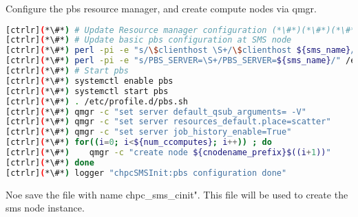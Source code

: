 
	Configure the pbs resource manager, and create compute nodes via qmgr.



\begin{lstlisting}[language=bash,keywords={}]
[ctrlr](*\#*) # Update Resource manager configuration (*\#*)(*\#*)(*\#*)
[ctrlr](*\#*) # Update basic pbs configuration at SMS node
[ctrlr](*\#*) perl -pi -e "s/\$clienthost \S+/\$clienthost ${sms_name}/" /var/spool/pbs/mom_priv/config
[ctrlr](*\#*) perl -pi -e "s/PBS_SERVER=\S+/PBS_SERVER=${sms_name}/" /etc/pbs.conf
[ctrlr](*\#*) # Start pbs 
[ctrlr](*\#*) systemctl enable pbs
[ctrlr](*\#*) systemctl start pbs
[ctrlr](*\#*) . /etc/profile.d/pbs.sh
[ctrlr](*\#*) qmgr -c "set server default_qsub_arguments= -V" 
[ctrlr](*\#*) qmgr -c "set server resources_default.place=scatter"
[ctrlr](*\#*) qmgr -c "set server job_history_enable=True"
[ctrlr](*\#*) for((i=0; i<${num_ccomputes}; i++)) ; do
[ctrlr](*\#*)    qmgr -c "create node ${cnodename_prefix}$((i+1))"
[ctrlr](*\#*) done
[ctrlr](*\#*) logger "chpcSMSInit:pbs configuration done"
\end{lstlisting} 


	Noe save the file with name chpc\_sms\_cinit". This file will be used to create the sms node instance.

